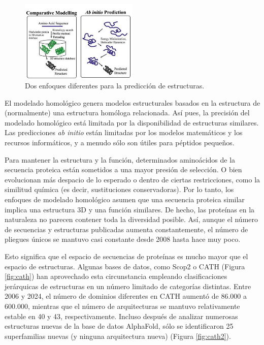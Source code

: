 \begin{figure}[h]
\centering
\includegraphics[width = 0.5\textwidth]{figs/predway.jpeg}
\caption{Dos enfoques diferentes para la predicción de estructuras.}
\end{figure}

El modelado homológico genera modelos estructurales basados en la estructura de (normalmente) una estructura homóloga relacionada. Así pues, la precisión del modelado homológico está limitada por la disponibilidad de estructuras similares. Las predicciones \textit{ab initio} están limitadas por los modelos matemáticos y los recursos informáticos, y a menudo sólo son útiles para péptidos pequeños.

Para mantener la estructura y la función, determinados aminoácidos de la secuencia proteica están sometidos a una mayor presión de selección. O bien evolucionan más despacio de lo esperado o dentro de ciertas restricciones, como la similitud química (es decir, sustituciones conservadoras). Por lo tanto, los enfoques de modelado homológico asumen que una secuencia proteica similar implica una estructura 3D y una función similares. De hecho, las proteínas en la naturaleza no parecen contener toda la diversidad posible. Así, aunque el número de secuencias y estructuras publicadas aumenta constantemente, el número de pliegues únicos se mantuvo casi constante desde 2008 hasta hace muy poco.

Esto significa que el espacio de secuencias de proteínas es mucho mayor que el espacio de estructuras. Algunas bases de datos, como Scop2 o CATH (Figura \ref{fig:cath}) han aprovechado esta circunstancia empleando clasificaciones jerárquicas de estructuras en un número limitado de categorías distintas. Entre 2006 y 2024, el número de dominios diferentes en CATH aumentó de 86.000 a 600.000, mientras que el número de arquitecturas se mantuvo relativamente estable en 40 y 43, respectivamente. Incluso después de analizar numerosas estructuras nuevas de la base de datos AlphaFold, sólo se identificaron 25 superfamilias nuevas (y ninguna arquitectura nueva) (Figura \ref{fig:cath2}).


